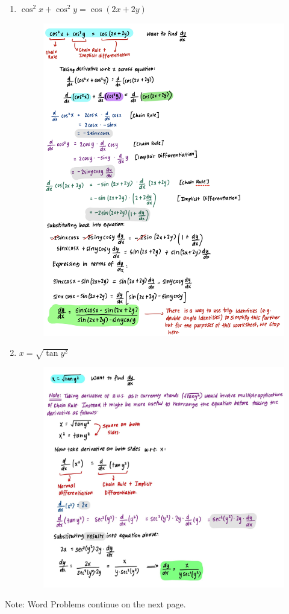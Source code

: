 \documentclass{article}
\begin{document}
\begin{enumerate}
    \item $ \cos^2 x + \cos^2 y = \cos( 2x + 2y )$ 
    \begin{figure}[H]
        \centering
        \includegraphics[width=0.95\linewidth]{Q5.jpg}
        \label{fig:Q5}
    \end{figure}

    \item $x = \sqrt{\tan y^2}$
    \begin{figure}[H]
        \centering
        \includegraphics[width=0.95\linewidth]{Q6.jpg}
        \label{fig:Q6}
    \end{figure}

\end{enumerate}
Note: Word Problems continue on the next page. 
\end{document}
